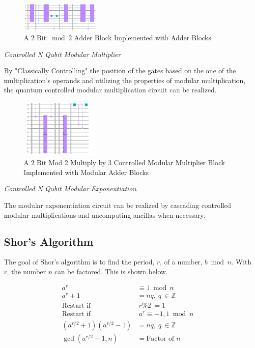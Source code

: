 \documentclass[journal]{IEEEtran}
\begin{document}
\begin{figure}[H]
    \begin{center}
        \includegraphics[width=0.35\textwidth]{ModAdder.png}
        \caption{\label{fig:ModAdder} A 2 Bit \(\bmod 2\) Adder Block Implemented with Adder Blocks }
    \end{center}
\end{figure}

\emph{Controlled N Qubit Modular Multiplier}

By "Classically Controlling" the position of the gates based on the one of the
multiplication's operands and utilizing the properties of modular
multiplication, the quantum controlled modular multiplication circuit can be
realized.

\begin{figure}[H]
    \begin{center}
        \includegraphics[width=0.35\textwidth]{CModMult.png}
        \caption{\label{fig:CModMult} A 2 Bit Mod 2 Multiply by 3 Controlled
            Modular Multiplier Block Implemented with Modular Adder Blocks }
    \end{center}
\end{figure}

\emph{Controlled N Qubit Modular Exponentiation}

The modular exponentiation circuit can be realized by cascading controlled
modular multiplications and uncomputing ancillas when necessary.

\subsection{Shor's Algorithm}
The goal of Shor's algorithm is to find the period, \(r\), of a number, \(b
\bmod n \). With \(r\), the number \(n\) can be factored. This is shown below.

\begin{align*}
    a^{r}                                            & \equiv 1\bmod n            \\
    a^{r} +1                                         & =nq,\ q\ \in \mathbb{Z}    \\
    \text{Restart if}                                & \ r\%2\ =1\                \\
    \text{Restart if}                                & \ a^{r} \equiv -1,1\bmod n \\
    \left( a^{r/2} +1\right)\left( a^{r/2} -1\right) & =nq,\ q\ \in \mathbb{Z}    \\
    \gcd\left( a^{r/2} -1,n\right)                   & =\text{Factor of } n
\end{align*}
\end{document}
